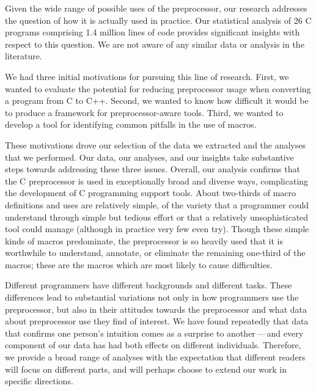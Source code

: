 \documentclass[10pt]{article}
\def\numpackages{26}
\def\numlinesalmost{1.4 million}
\begin{document}
Given the wide range of possible uses of the preprocessor, our
research addresses the question of how it is actually used in
practice.  Our statistical analysis of {\numpackages} C programs
comprising {\numlinesalmost} lines of code provides significant
insights with respect to this question.  We are not aware of any
similar data or analysis in the literature.

We had three initial motivations for pursuing this line of research.
First, we wanted to evaluate the potential for reducing
preprocessor usage when converting a program from C to C++.
Second, we wanted to know how difficult it would be to produce a
framework for preprocessor-aware tools.  Third, we wanted to develop a
tool for identifying common pitfalls in the use of macros.

These motivations drove our selection of the data we extracted and the
analyses that we performed.  Our data, our analyses, and our insights
take substantive steps towards addressing these three issues.
Overall, our analysis confirms that the C preprocessor is used in
exceptionally broad and diverse ways, complicating the development of
C programming support tools.  About two-thirds of macro definitions
and uses are relatively simple, of the variety that a programmer could
understand through simple but tedious effort or that a relatively
unsophisticated tool could manage (although in practice very few even
try).  Though these simple kinds of macros predominate, the preprocessor is so
heavily used that it is worthwhile to understand, annotate, or
eliminate the remaining one-third of the macros; these are the macros which are most likely
to cause difficulties.

Different programmers have different backgrounds and different tasks.  These
differences lead to substantial variations not only in how programmers use
the preprocessor, but also in their attitudes towards the preprocessor and
what data about preprocessor use they find of interest.  We
have found repeatedly that data that confirms one person's intuition comes
as a surprise to another\,---\,and every component of our data has had both
effects on different individuals.  Therefore, we provide a broad range
of analyses with the expectation that different readers will focus on
different parts, and will perhaps choose to extend our work in specific
directions.
\end{document}
